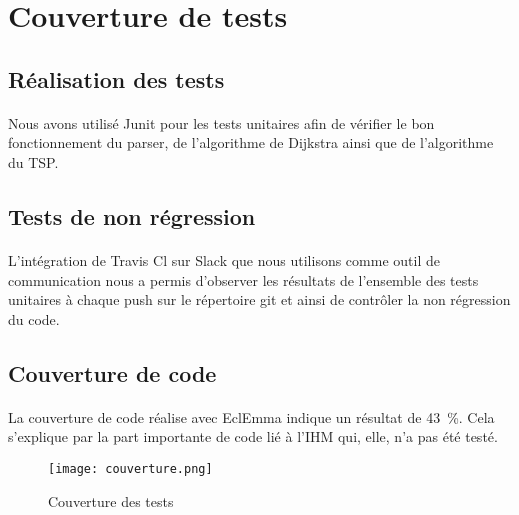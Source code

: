 \documentclass[a4paper,10pt]{article}
\begin{document}
  
\FloatBarrier


\FloatBarrier



\FloatBarrier
\section{Couverture de tests}
\subsection{Réalisation des tests}
\paragraph{}
Nous avons utilisé Junit pour les tests unitaires afin de vérifier le bon fonctionnement du parser, de l’algorithme de Dijkstra ainsi que de l’algorithme du TSP.

\subsection{Tests de non régression}
\paragraph{}
L’intégration de Travis Cl sur Slack que nous utilisons comme outil de communication nous a permis d’observer les résultats de l’ensemble des tests unitaires à chaque push sur le répertoire git et ainsi de contrôler la non régression du code.

\subsection{Couverture de code}
\paragraph{}
La couverture de code réalise avec EclEmma indique un résultat de 43 \%. Cela s’explique par la part importante de code lié à l’IHM qui, elle, n’a pas été testé. 

\begin{figure}[h!]
  \begin{center}
    \texttt{[image: couverture.png]}
    \caption{Couverture des tests}
    \label{fig:}
  \end{center}
\end{figure}
\end{document}
